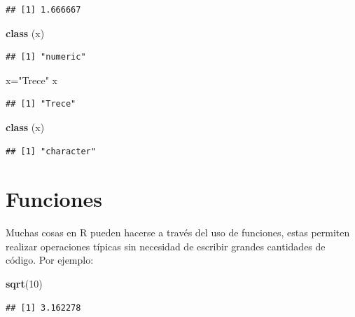 \documentclass[
]{book}
\newenvironment{Shaded}{\begin{snugshade}}{\end{snugshade}}
\newcommand{\DecValTok}[1]{\textcolor[rgb]{0.00,0.00,0.81}{#1}}
\newcommand{\FunctionTok}[1]{\textcolor[rgb]{0.13,0.29,0.53}{\textbf{#1}}}
\newcommand{\NormalTok}[1]{#1}
\newcommand{\OtherTok}[1]{\textcolor[rgb]{0.56,0.35,0.01}{#1}}
\newcommand{\StringTok}[1]{\textcolor[rgb]{0.31,0.60,0.02}{#1}}
\begin{document}
\begin{verbatim}
## [1] 1.666667
\end{verbatim}

\begin{Shaded}
\begin{Highlighting}[]
\FunctionTok{class}\NormalTok{ (x)}
\end{Highlighting}
\end{Shaded}

\begin{verbatim}
## [1] "numeric"
\end{verbatim}

\begin{Shaded}
\begin{Highlighting}[]
\NormalTok{x}\OtherTok{=}\StringTok{"Trece"}
\NormalTok{x}
\end{Highlighting}
\end{Shaded}

\begin{verbatim}
## [1] "Trece"
\end{verbatim}

\begin{Shaded}
\begin{Highlighting}[]
\FunctionTok{class}\NormalTok{ (x)}
\end{Highlighting}
\end{Shaded}

\begin{verbatim}
## [1] "character"
\end{verbatim}

\hypertarget{funciones}{%
\section{Funciones}\label{funciones}}

Muchas cosas en R pueden hacerse a través del uso de funciones, estas
permiten realizar operaciones típicas sin necesidad de escribir grandes
cantidades de código. Por ejemplo:

\begin{Shaded}
\begin{Highlighting}[]
\FunctionTok{sqrt}\NormalTok{(}\DecValTok{10}\NormalTok{)}
\end{Highlighting}
\end{Shaded}

\begin{verbatim}
## [1] 3.162278
\end{verbatim}
\end{document}
